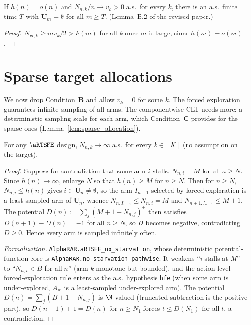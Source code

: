 \begin{lemma}\label{lem:fe_inactivity}
\leanok
{}
If $h(n)=o(n)$ and $N_{n,k}/n\to v_k>0$ a.s.\ for every $k$, there is an a.s.\ finite time $T$
with $\mathbf U_m=\emptyset$ for all $m\ge T$. (Lemma~B.2 of the revised paper.)
\end{lemma}

\begin{proof}\leanok
$N_{m,k}\ge mv_k/2>h(m)$ for all $k$ once $m$ is large, since $h(m)=o(m)$.
\end{proof}

\section{Sparse target allocations}
\label{sec:forced_sparse}

We now drop Condition~\textbf{B} and allow $v_k=0$ for some $k$. The forced
exploration guarantees infinite sampling of all arms. The componentwise CLT needs more: a
deterministic sampling scale for each arm, which Condition~\textbf{C} provides for the sparse
ones (Lemma~\ref{lem:sparse_allocation}).

\begin{lemma}\label{lem:fe_no_starvation}
\leanok
{}
For any $\aRTSFE$ design, $N_{n,k}\to\infty$ a.s.\ for every $k\in[K]$ (no
assumption on the target).
\end{lemma}

\begin{proof}
Suppose for contradiction that some arm $i$ stalls: $N_{n,i}=M$ for all $n\ge N$.
Since $h(n)\to\infty$, enlarge $N$ so that $h(n)\ge M$ for $n\ge N$. Then for
$n\ge N$, $N_{n,i}\le h(n)$ gives $i\in\mathbf{U}_n\ne\emptyset$, so the arm
$I_{n+1}$ selected by forced exploration is a least-sampled arm of $\mathbf{U}_n$,
whence $N_{n,I_{n+1}}\le N_{n,i}=M$ and $N_{n+1,I_{n+1}}\le M+1$. The potential
$D(n):=\sum_j (M+1-N_{n,j})^+$ then satisfies $D(n+1)-D(n)=-1$ for all $n\ge N$,
so $D$ becomes negative, contradicting $D\ge0$. Hence every arm is sampled
infinitely often.

\emph{Formalization.} \texttt{AlphaRAR.aRTSFE\_no\_starvation}, whose deterministic potential-function
core is \texttt{AlphaRAR.no\_starvation\_pathwise}. It weakens ``$i$ stalls at $M$'' to ``$N_{n,i}<B$
for all $n$'' (arm $k$ monotone but bounded), and the action-level forced-exploration rule enters as
the a.s.\ hypothesis \texttt{hfe} (when some arm is under-explored, $A_m$ is a least-sampled
under-explored arm). The potential $D(n)=\sum_j(B+1-N_{n,j})$ is $\N$-valued (truncated subtraction is
the positive part), so $D(n+1)+1=D(n)$ for $n\ge N_1$ forces $t\le D(N_1)$ for all $t$, a contradiction.
\end{proof}

